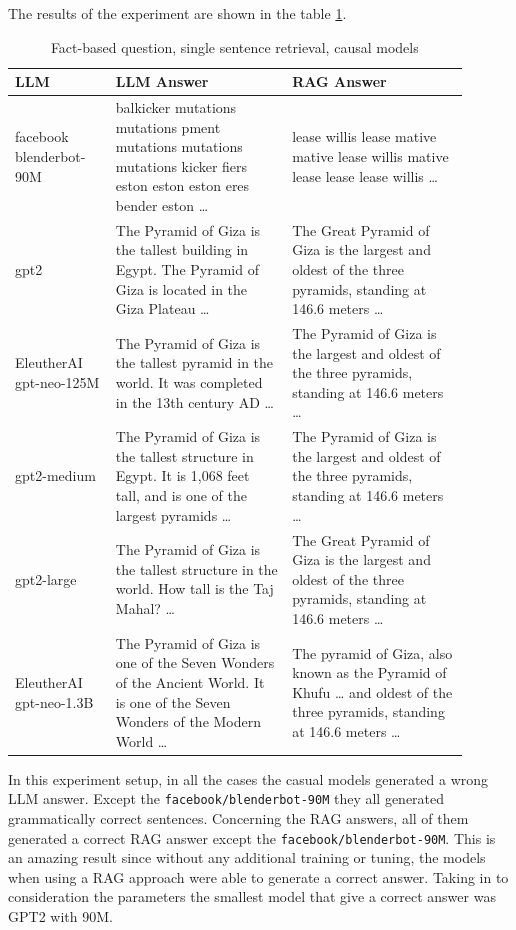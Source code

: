 \documentclass{wseas}
\begin{document}
The results of the experiment are shown in the table \ref{tab:experiment_R_1_sentence_Q_fact_M_casual_table}.
\begin{table}[htbp]
  \centering
  \caption{Fact-based question, single sentence retrieval, causal models} %
  \label{tab:experiment_R_1_sentence_Q_fact_M_casual_table}  %
    \begin{tabular}{|p{0.20\linewidth}|p{0.35\linewidth}|p{0.35\linewidth}|}
      \hline
      \textbf{LLM} & \textbf{LLM Answer} & \textbf{RAG Answer} \\ \hline
      facebook blenderbot-90M & balkicker mutations mutations pment mutations mutations mutations kicker fiers eston eston eston eres bender eston \ldots{} & lease willis lease mative mative lease willis mative lease lease lease willis \ldots{} \\ \hline
      gpt2 & The Pyramid of Giza is the tallest building in Egypt. The Pyramid of Giza is located in the Giza Plateau \ldots{} & The Great Pyramid of Giza is the largest and oldest of the three pyramids, standing at 146.6 meters \ldots{} \\ \hline
      EleutherAI gpt-neo-125M & The Pyramid of Giza is the tallest pyramid in the world. It was completed in the 13th century AD \ldots{} & The Pyramid of Giza is the largest and oldest of the three pyramids, standing at 146.6 meters \ldots{} \\ \hline
      gpt2-medium & The Pyramid of Giza is the tallest structure in Egypt. It is 1,068 feet tall, and is one of the largest pyramids \ldots{} & The Pyramid of Giza is the largest and oldest of the three pyramids, standing at 146.6 meters \ldots{} \\ \hline
      gpt2-large & The Pyramid of Giza is the tallest structure in the world. How tall is the Taj Mahal? \ldots{} & The Great Pyramid of Giza is the largest and oldest of the three pyramids, standing at 146.6 meters \ldots{} \\ \hline
      EleutherAI gpt-neo-1.3B & The Pyramid of Giza is one of the Seven Wonders of the Ancient World. It is one of the Seven Wonders of the Modern World \ldots{} & The pyramid of Giza, also known as the Pyramid of Khufu \ldots{} and oldest of the three pyramids, standing at 146.6 meters \ldots{} \\ \hline
    \end{tabular}
\end{table}
In this experiment setup, in all the cases the casual models generated a wrong LLM answer. Except
the \texttt{facebook/blenderbot-90M} they all generated grammatically
correct sentences. Concerning the RAG answers, all of them generated a
correct RAG answer except the \texttt{facebook/blenderbot-90M}. This is
an amazing result since without any additional training or tuning, the
models when using a RAG approach were able to generate a correct answer.
Taking in to consideration the parameters the smallest model that give a
correct answer was GPT2 with 90M.
\end{document}
